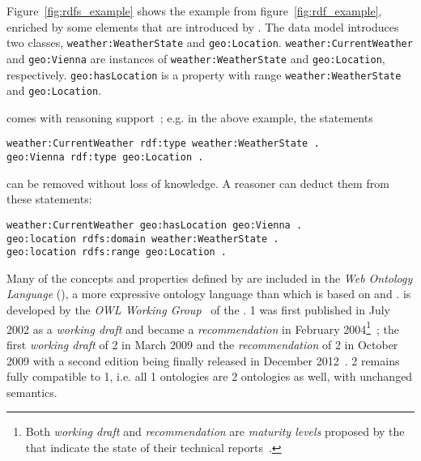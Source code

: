 Figure~\ref{fig:rdfs_example} shows the example from figure~\ref{fig:rdf_example}, enriched by some elements that are introduced by . The data model introduces two classes, \texttt{weather:\hspace{0pt}Weather\hspace{0pt}State} and \texttt{geo:\hspace{0pt}Location}. \texttt{weather:\hspace{0pt}CurrentWeather} and \texttt{geo:\hspace{0pt}Vienna} are instances of \texttt{weather:\hspace{0pt}Weather\hspace{0pt}State} and \texttt{geo:\hspace{0pt}Location}, respectively. \texttt{geo:\hspace{0pt}has\hspace{0pt}Location} is a property with range \texttt{weather:\hspace{0pt}Weather\hspace{0pt}State} and \texttt{geo:\hspace{0pt}Location}.

 comes with reasoning support~\cite{RDF_semantics}; e.g. in the above example, the statements

\begin{lstlisting}
weather:CurrentWeather rdf:type weather:WeatherState .
geo:Vienna rdf:type geo:Location .
\end{lstlisting}

can be removed without loss of knowledge. A reasoner can deduct them from these statements:

\begin{lstlisting}
weather:CurrentWeather geo:hasLocation geo:Vienna .
geo:location rdfs:domain weather:WeatherState .
geo:location rdfs:range geo:Location .
\end{lstlisting}

\vspace{1em}

Many of the concepts and properties defined by  are included in the \emph{Web Ontology Language} (), a more expressive ontology language than  which is based on  and .  is developed by the \emph{OWL Working Group}~\cite{OWL-working-group} of the .  1 was first published in July 2002 as a \emph{working draft} and became a  \emph{recommendation} in February 2004\footnote{Both \emph{working draft} and \emph{recommendation} are \emph{maturity levels} proposed by the  that indicate the state of their technical reports~\cite{w3c-process}.}~\cite{OWL1}; the first \emph{working draft} of  2 in March 2009 and the  \emph{recommendation} of  2 in October 2009 with a second edition being finally released in December 2012~\cite{OWL}.
 2 remains fully compatible to  1, i.e. all  1 ontologies are  2 ontologies as well, with unchanged semantics.

